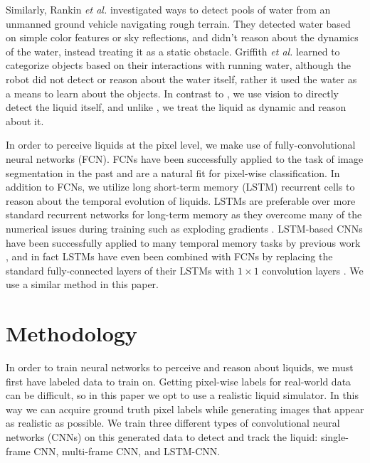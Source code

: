 \documentclass[runningheads,a4paper]{llncs}
\begin{document}
Similarly, Rankin {\it et al.} \cite{rankin2010,rankin2011} investigated ways to detect pools of water from an unmanned ground vehicle navigating rough terrain. 
They detected water based on simple color features or sky reflections, and didn't reason about the dynamics of the water, instead treating it as a static obstacle. 
Griffith {\it et al.} \cite{griffith2012} learned to categorize objects based on their interactions with running water, although the robot did not detect or reason about the water itself, rather it used the water as a means to learn about the objects.
In contrast to \cite{griffith2012}, we use vision to directly detect the liquid itself, and unlike \cite{rankin2010,rankin2011}, we treat the liquid as dynamic and reason about it.

In order to perceive liquids at the pixel level, we make use of
fully-convolutional neural networks (FCN). FCNs have been successfully applied
to the task of image segmentation in the past
\cite{long2015,havaei2015,romera2015} and are a natural fit for pixel-wise
classification. In addition to FCNs, we utilize long short-term memory (LSTM)
\cite{hochreiter1997} recurrent cells to reason about the temporal evolution of
liquids. LSTMs are preferable over more standard recurrent networks for
long-term memory as they overcome many of the numerical issues during training
such as exploding gradients \cite{greff2015}. LSTM-based CNNs have been
successfully applied to many temporal memory tasks by previous work
\cite{junhyuk2015,romera2015}, and in fact LSTMs have even been combined with FCNs by replacing the standard fully-connected layers of their LSTMs with
$1\times1$ convolution layers \cite{romera2015}. We use a similar method in this paper.

\vspace{-0.3cm}
\section{Methodology}
\label{sec:methodology}
\vspace{-0.5cm}

In order to train neural networks to perceive and reason about liquids, we must first have labeled data to train on. 
Getting pixel-wise labels for real-world data can be difficult, so in this paper we opt to use a realistic liquid simulator. 
In this way we can acquire ground truth pixel labels while generating images that appear as realistic as possible.
We train three different types of convolutional neural networks (CNNs) on this generated data to detect and track the liquid: single-frame CNN, multi-frame CNN, and LSTM-CNN.
\end{document}
